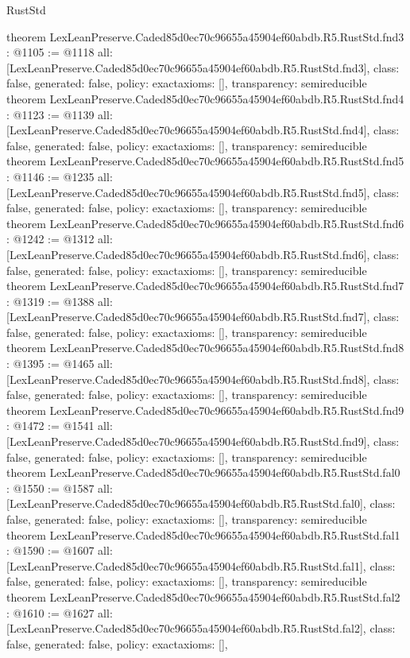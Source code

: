 \begin{lexlean}{RustStd}
\begin{coremodule}
theorem LexLeanPreserve.Caded85d0ec70c96655a45904ef60abdb.R5.RustStd.fnd3 : @1105 := @1118 {
  all: [LexLeanPreserve.Caded85d0ec70c96655a45904ef60abdb.R5.RustStd.fnd3],
  class: false,
  generated: false,
  policy: exact{axioms: []},
  transparency: semireducible
}
theorem LexLeanPreserve.Caded85d0ec70c96655a45904ef60abdb.R5.RustStd.fnd4 : @1123 := @1139 {
  all: [LexLeanPreserve.Caded85d0ec70c96655a45904ef60abdb.R5.RustStd.fnd4],
  class: false,
  generated: false,
  policy: exact{axioms: []},
  transparency: semireducible
}
theorem LexLeanPreserve.Caded85d0ec70c96655a45904ef60abdb.R5.RustStd.fnd5 : @1146 := @1235 {
  all: [LexLeanPreserve.Caded85d0ec70c96655a45904ef60abdb.R5.RustStd.fnd5],
  class: false,
  generated: false,
  policy: exact{axioms: []},
  transparency: semireducible
}
theorem LexLeanPreserve.Caded85d0ec70c96655a45904ef60abdb.R5.RustStd.fnd6 : @1242 := @1312 {
  all: [LexLeanPreserve.Caded85d0ec70c96655a45904ef60abdb.R5.RustStd.fnd6],
  class: false,
  generated: false,
  policy: exact{axioms: []},
  transparency: semireducible
}
theorem LexLeanPreserve.Caded85d0ec70c96655a45904ef60abdb.R5.RustStd.fnd7 : @1319 := @1388 {
  all: [LexLeanPreserve.Caded85d0ec70c96655a45904ef60abdb.R5.RustStd.fnd7],
  class: false,
  generated: false,
  policy: exact{axioms: []},
  transparency: semireducible
}
theorem LexLeanPreserve.Caded85d0ec70c96655a45904ef60abdb.R5.RustStd.fnd8 : @1395 := @1465 {
  all: [LexLeanPreserve.Caded85d0ec70c96655a45904ef60abdb.R5.RustStd.fnd8],
  class: false,
  generated: false,
  policy: exact{axioms: []},
  transparency: semireducible
}
theorem LexLeanPreserve.Caded85d0ec70c96655a45904ef60abdb.R5.RustStd.fnd9 : @1472 := @1541 {
  all: [LexLeanPreserve.Caded85d0ec70c96655a45904ef60abdb.R5.RustStd.fnd9],
  class: false,
  generated: false,
  policy: exact{axioms: []},
  transparency: semireducible
}
theorem LexLeanPreserve.Caded85d0ec70c96655a45904ef60abdb.R5.RustStd.fal0 : @1550 := @1587 {
  all: [LexLeanPreserve.Caded85d0ec70c96655a45904ef60abdb.R5.RustStd.fal0],
  class: false,
  generated: false,
  policy: exact{axioms: []},
  transparency: semireducible
}
theorem LexLeanPreserve.Caded85d0ec70c96655a45904ef60abdb.R5.RustStd.fal1 : @1590 := @1607 {
  all: [LexLeanPreserve.Caded85d0ec70c96655a45904ef60abdb.R5.RustStd.fal1],
  class: false,
  generated: false,
  policy: exact{axioms: []},
  transparency: semireducible
}
theorem LexLeanPreserve.Caded85d0ec70c96655a45904ef60abdb.R5.RustStd.fal2 : @1610 := @1627 {
  all: [LexLeanPreserve.Caded85d0ec70c96655a45904ef60abdb.R5.RustStd.fal2],
  class: false,
  generated: false,
  policy: exact{axioms: []},
}
\end{coremodule}
\end{lexlean}
